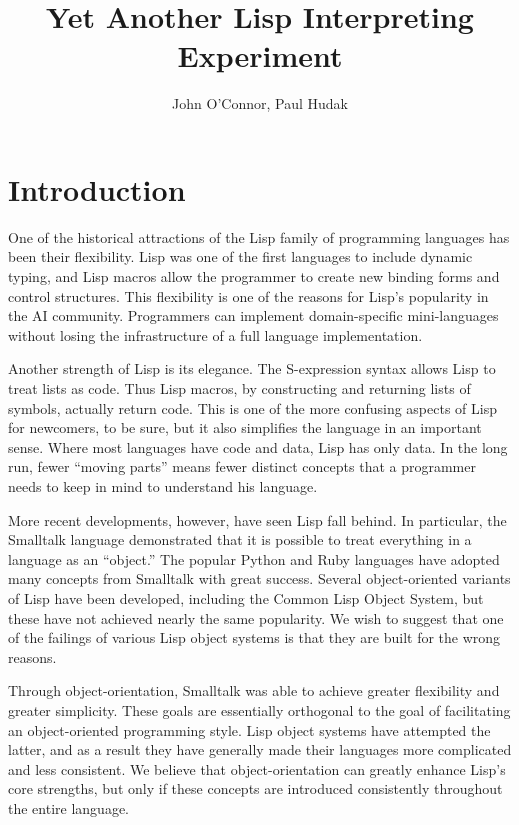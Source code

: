 \documentclass[twocolumn]{article}
\title{Yet Another Lisp Interpreting Experiment}
\author{John O'Connor, Paul Hudak}
\date{}
\begin{document}
\maketitle

\section*{Introduction}
One of the historical attractions of the Lisp family of programming
languages has been their flexibility. Lisp was one of the first
languages to include dynamic typing, and Lisp macros allow the
programmer to create new binding forms and control structures. This
flexibility is one of the reasons for Lisp's popularity in the AI
community. Programmers can implement domain-specific mini-languages
without losing the infrastructure of a full language implementation.

Another strength of Lisp is its elegance. The S-expression syntax
allows Lisp to treat lists as code. Thus Lisp macros, by constructing
and returning lists of symbols, actually return code. This is one of
the more confusing aspects of Lisp for newcomers, to be sure, but it
also simplifies the language in an important sense. Where most
languages have code and data, Lisp has only data. In the long run,
fewer ``moving parts'' means fewer distinct concepts that a programmer
needs to keep in mind to understand his language.

More recent developments, however, have seen Lisp fall behind. In
particular, the Smalltalk language demonstrated that it is possible to
treat everything in a language as an ``object.'' The popular Python
and Ruby languages have adopted many concepts from Smalltalk with
great success. Several object-oriented variants of Lisp have been
developed, including the Common Lisp Object System, but these have not
achieved nearly the same popularity. We wish to suggest that one of
the failings of various Lisp object systems is that they are built for
the wrong reasons.

Through object-orientation, Smalltalk was able to achieve greater
flexibility and greater simplicity. These goals are essentially
orthogonal to the goal of facilitating an object-oriented programming
style. Lisp object systems have attempted the latter, and as a result
they have generally made their languages more complicated and less
consistent. We believe that object-orientation can greatly enhance
Lisp's core strengths, but only if these concepts are introduced
consistently throughout the entire language.
\end{document}
